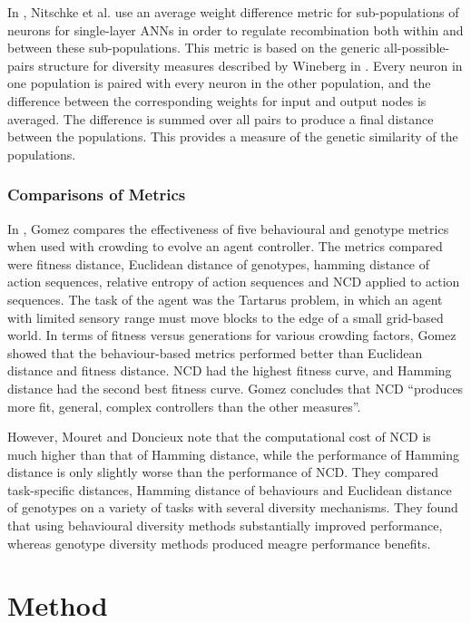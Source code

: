 \documentclass[12pt]{article} %
\begin{document}
In \cite{Nitschke2010}, Nitschke et al. use an average weight difference metric for sub-populations of neurons for single-layer ANNs in order to regulate recombination both within and between these sub-populations. This metric is based on the generic all-possible-pairs structure for diversity measures described by Wineberg in \cite{Wineberg2003}. Every neuron in one population is paired with every neuron in the other population, and the difference between the corresponding weights for input and output nodes is averaged. The difference is summed over all pairs to produce a final distance between the populations. This provides a measure of the genetic similarity of the populations.

\subsubsection{Comparisons of Metrics}

In \cite{Gomez2009}, Gomez compares the effectiveness of five behavioural and genotype metrics when used with crowding to evolve an agent controller. The metrics compared were fitness distance, Euclidean distance of genotypes, hamming distance of action sequences, relative entropy of action sequences and NCD applied to action sequences. The task of the agent was the Tartarus problem, in which an agent with limited sensory range must move blocks to the edge of a small grid-based world. In terms of fitness versus generations for various crowding factors, Gomez showed that the behaviour-based metrics performed better than Euclidean distance and fitness distance. NCD had the highest fitness curve, and Hamming distance had the second best fitness curve. Gomez concludes that NCD ``produces more fit, general, complex controllers than the other measures''.

However, Mouret and Doncieux \cite{Mouret2012} note that the computational cost of NCD is much higher than that of Hamming distance, while the performance of Hamming distance is only slightly worse than the performance of NCD. They compared task-specific distances, Hamming distance of behaviours and Euclidean distance of genotypes on a variety of tasks with several diversity mechanisms. They found that using behavioural diversity methods substantially improved performance, whereas genotype diversity methods produced meagre performance benefits.

\section{Method}
\end{document}
